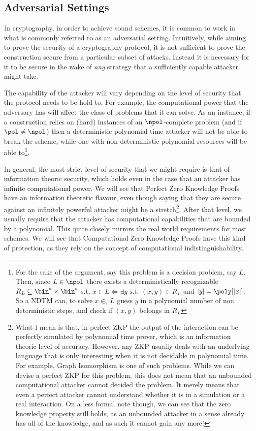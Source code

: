 \documentclass{article}
\begin{document}
\subsection{Adversarial Settings}
In cryptography, in order to achieve sound schemes, it is common to work in what is commonly referred to as an adversarial setting.
Intuitively, while aiming to prove the security of a cryptography protocol, it is not sufficient to prove the construction secure from a particular subset of attacks. Instead it is necessary for it to be secure in the wake of \textit{any} strategy that a sufficiently capable attacker might take. \par

The capability of the attacker will vary depending on the level of security that the protocol needs to be hold to. For example, the computational power that the adversary has will affect the class of problems that it can solve.
As an instance, if a construction relies on (hard) instances of an $\npol$-complete problem (and if $\pol \neq \npol$) then a deterministic polynomial time attacker will not be able to break the scheme, while one with non-deterministic polynomial resources will be able to\footnote{For the sake of the argument, say this problem is a decision problem, say $L$. Then, since $L \in \npol$ there exists a deterministically recognizable $R_L \subseteq \bin^* \times \bin^* $ s.t. $x \in L \iff \exists y \text{ s.t. } (x, y) \in R_L$ and $|y| = \poly[|x|]$. So a NDTM can, to solve $x \in_? L$ guess $y$ in a polynomial number of non deterministic steps, and check if $(x, y)$ belongs in $R_L$ }.

In general, the most strict level of security that we might require is that of information theoric security, which holds even in the case that
an attacker has infinite computational power. We will see that Perfect Zero Knowledge Proofs have an information theoretic flavour, even
though saying that they are secure against an infinitely powerful attacker might be a stretch\footnote{What I mean is that, in perfect ZKP the output of the interaction can be perfectly simulated by polynomial time prover, which is
    an information theoric level of accuracy. However, any ZKP usually deals with an underlying language that is only interesting when it is not
    decidable in polynomial time. For example, Graph Isomorphism is one of such problems. While we can devise a perfect ZKP for this problem, this
    does not mean that an unbounded computational attacker cannot decided the problem. It merely means that even a perfect attacker cannot
    understand whether it is in a simulation or a real interaction. On a less formal note though, we can see that the zero knowledge
    property still holds, as an unbounded attacker in a sense already has all of the knowledge, and as such it cannot gain any more!}.
After that level, we usually require that the attacker has computational capabilities that are bounded by a polynomial.
This quite closely mirrors the real world requirements for most schemes. We will see that Computational Zero Knowledge Proofs
have this kind of protection, as they rely on the concept of computational indistinguishability.
\end{document}
